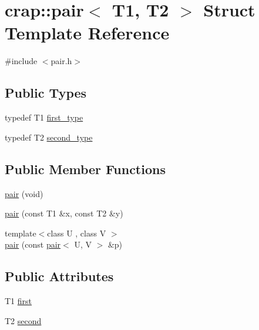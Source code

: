 \hypertarget{structcrap_1_1pair}{\section{crap\-:\-:pair$<$ T1, T2 $>$ Struct Template Reference}
\label{structcrap_1_1pair}
}


{\ttfamily \#include $<$pair.\-h$>$}

\subsection*{Public Types}
\begin{DoxyCompactItemize}
\item 
typedef T1 \hyperlink{structcrap_1_1pair_a3e7b8960fdb3e682b91135d1ddec2833}{first\-\_\-type}
\item 
typedef T2 \hyperlink{structcrap_1_1pair_a79e49172c1947b06e27178b7cc3f0f06}{second\-\_\-type}
\end{DoxyCompactItemize}
\subsection*{Public Member Functions}
\begin{DoxyCompactItemize}
\item 
\hyperlink{structcrap_1_1pair_aa99c7b2384e4eef00f3fefe03f3086a0}{pair} (void)
\item 
\hyperlink{structcrap_1_1pair_a5af0c0ddbf79f29dc2737a81805c2d3a}{pair} (const T1 \&x, const T2 \&y)
\item 
{\footnotesize template$<$class U , class V $>$ }\\\hyperlink{structcrap_1_1pair_a9b9de163d05aa9d2cc29945275471968}{pair} (const \hyperlink{structcrap_1_1pair}{pair}$<$ U, V $>$ \&p)
\end{DoxyCompactItemize}
\subsection*{Public Attributes}
\begin{DoxyCompactItemize}
\item 
T1 \hyperlink{structcrap_1_1pair_a1c7b7e7d1bdade135233bb71457c05b3}{first}
\item 
T2 \hyperlink{structcrap_1_1pair_ac2b9b46da996e52e23b4ecbd843a79c8}{second}
\end{DoxyCompactItemize}


